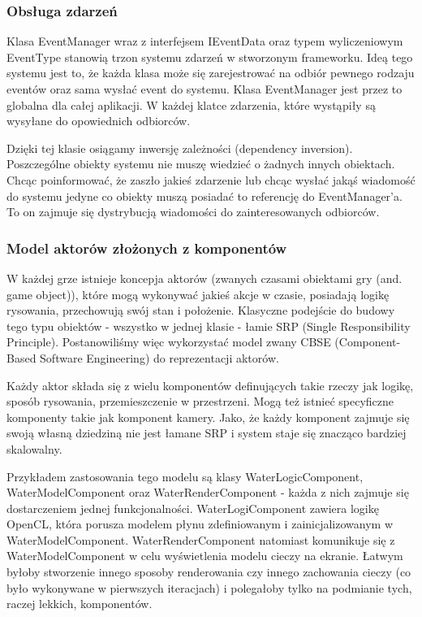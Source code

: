 \documentclass[polish, 12pt]{aghthesis}
\begin{document}
		\subsubsection{Obsługa zdarzeń}
			Klasa EventManager wraz z interfejsem IEventData oraz typem wyliczeniowym EventType stanowią trzon systemu zdarzeń w stworzonym frameworku. Ideą tego systemu jest to, że każda klasa może się zarejestrować na odbiór pewnego rodzaju eventów oraz sama wysłać event do systemu. Klasa EventManager jest przez to globalna dla całej aplikacji. W każdej klatce zdarzenia, które wystąpiły są wysyłane do opowiednich odbiorców.
			
			Dzięki tej klasie osiągamy inwersję zależności (dependency inversion). Poszczególne obiekty systemu nie muszę wiedzieć o żadnych innych obiektach. Chcąc poinformować, że zaszło jakieś zdarzenie lub chcąc wysłać jakąś wiadomość do systemu jedyne co obiekty muszą posiadać to referencję do EventManager'a. To on zajmuje się dystrybucją wiadomości do zainteresowanych odbiorców.
		 
		\subsubsection{Model aktorów złożonych z komponentów}
		
			W każdej grze istnieje koncepja aktorów (zwanych czasami obiektami gry (and. game object)), które mogą wykonywać jakieś akcje w czasie, posiadają logikę rysowania, przechowują swój stan i położenie. Klasyczne podejście do budowy tego typu obiektów - wszystko w jednej klasie - łamie SRP (Single Responsibility Principle). Postanowiliśmy więc wykorzystać model zwany CBSE (Component-Based Software Engineering) do reprezentacji aktorów. 
			
			Każdy aktor składa się z wielu komponentów definujących takie rzeczy jak logikę, sposób rysowania, przemieszczenie w przestrzeni. Mogą też istnieć specyficzne komponenty takie jak komponent kamery. Jako, że każdy komponent zajmuje się swoją własną dziedziną nie jest łamane SRP i system staje się znacząco bardziej skalowalny. 
			
			Przykładem zastosowania tego modelu są klasy WaterLogicComponent, WaterModelComponent oraz WaterRenderComponent - każda z nich zajmuje się dostarczeniem jednej funkcjonalności. WaterLogiComponent zawiera logikę OpenCL, która porusza modelem płynu zdefiniowanym i zainicjalizowanym w WaterModelComponent. WaterRenderComponent natomiast komunikuje się z WaterModelComponent w celu wyświetlenia modelu cieczy na ekranie. Łatwym byłoby stworzenie innego sposoby renderowania czy innego zachowania cieczy (co było wykonywane w pierwszych iteracjach) i polegałoby tylko na podmianie tych, raczej lekkich, komponentów.
			
\end{document}
